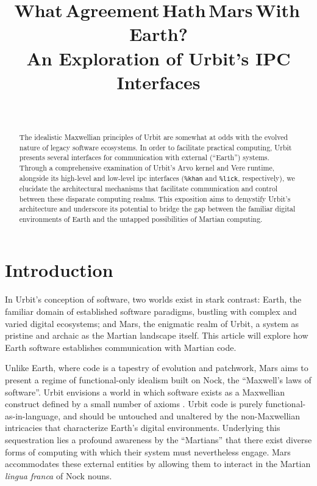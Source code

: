 \documentclass[twoside]{article}
\title{What\,Agreement\,Hath\,Mars\,With\,Earth? \\ An Exploration of Urbit's IPC Interfaces}
\author{~\authorpatp \\ \affiliation}
\date{}
\begin{document}
\maketitle
\thispagestyle{firststyle}

\begin{abstract}
\noindent \sloppy
The idealistic Maxwellian principles of Urbit are somewhat at odds with the evolved nature of legacy software ecosystems.  In order to facilitate practical computing, Urbit presents several interfaces for communication with external (“Earth”) systems.  Through a comprehensive examination of Urbit's Arvo kernel and Vere runtime, alongside its high-level and low-level {\sc ipc} interfaces (\texttt{\%khan} and \texttt{\%lick}, respectively), we elucidate the architectural mechanisms that facilitate communication and control between these disparate computing realms.  This exposition aims to demystify Urbit's architecture and underscore its potential to bridge the gap between the familiar digital environments of Earth and the untapped possibilities of Martian computing.
\end{abstract}

\setcounter{page}{1}

\tableofcontents

\section{Introduction}

In Urbit's conception of software, two worlds exist in stark contrast:  Earth, the familiar domain of established software paradigms, bustling with complex and varied digital ecosystems; 
and Mars, the enigmatic realm of Urbit, a system as pristine and archaic as the Martian landscape itself.  This article will explore how Earth software establishes communication with Martian code.

\sloppy
Unlike Earth, where code is a tapestry of evolution and patchwork, Mars aims to present a regime of functional-only idealism built on Nock, the ``Maxwell's laws of software''.  Urbit envisions a world in which software exists as a Maxwellian construct defined by a small number of axioms \citep{Nock4K}.  Urbit code is purely functional-as-in-language, and should be untouched and unaltered by the non-Maxwellian intricacies that characterize Earth’s digital environments.  Underlying this sequestration lies a profound awareness by the ``Martians'' that there exist diverse forms of computing with which their system must nevertheless engage.  Mars accommodates these external entities by allowing them to interact in the Martian \emph{lingua franca} of Nock nouns.
\end{document}
